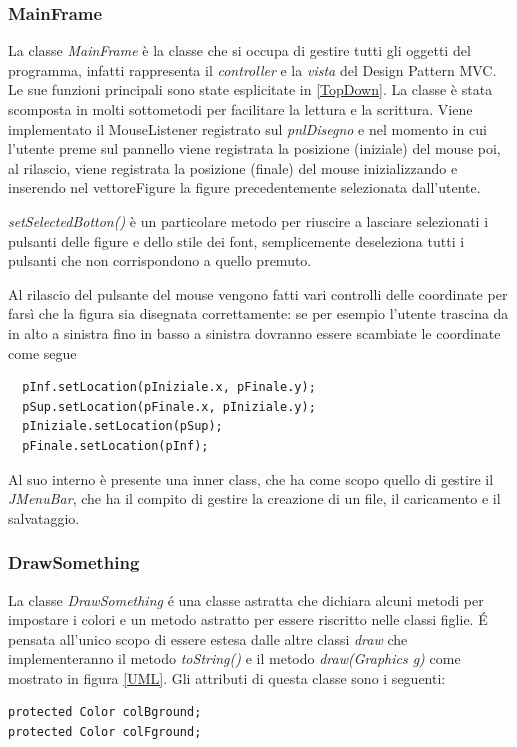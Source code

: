 \documentclass[a4paper,12pt,times,numbered,print,index]{article}
\begin{document}
\subsubsection{MainFrame} %
La classe \textit{MainFrame} è la classe che si occupa di gestire tutti gli oggetti del programma, infatti rappresenta il \textit{controller} e la \textit{vista} del Design Pattern MVC. Le sue funzioni principali sono state esplicitate in \ref{TopDown}. La classe è stata scomposta in molti sottometodi per facilitare la lettura e la scrittura. Viene implementato il MouseListener registrato sul \textit{pnlDisegno} e nel momento in cui l'utente preme sul pannello viene registrata la posizione (iniziale) del mouse poi, al rilascio, viene registrata la posizione (finale) del mouse inizializzando e inserendo nel vettoreFigure la figure precedentemente selezionata dall'utente.

\textit{setSelectedBotton()} è un particolare metodo per riuscire a lasciare selezionati i pulsanti delle figure e dello stile dei font, semplicemente deseleziona tutti i pulsanti che non corrispondono a quello premuto.

Al rilascio del pulsante del mouse vengono fatti vari controlli delle coordinate per farsì che la figura sia disegnata correttamente: se per esempio l'utente trascina da in alto a sinistra fino in basso a sinistra dovranno essere scambiate le coordinate come segue
\begin{lstlisting}
  pInf.setLocation(pIniziale.x, pFinale.y);
  pSup.setLocation(pFinale.x, pIniziale.y);
  pIniziale.setLocation(pSup);
  pFinale.setLocation(pInf);
\end{lstlisting}
Al suo interno è presente una inner class, che ha come scopo quello di gestire il \textit{JMenuBar}, che ha il compito di gestire la creazione di un file, il caricamento e il salvataggio.

\subsubsection{DrawSomething}
La classe \textit{DrawSomething} é una classe astratta che dichiara alcuni metodi per impostare i colori e un metodo astratto per essere riscritto nelle classi figlie.
É pensata all'unico scopo di essere estesa dalle altre classi \textit{draw} che implementeranno il metodo \textit{toString()} e il metodo \textit{draw(Graphics g)} come mostrato in figura \ref{UML}.
Gli attributi di questa classe sono i seguenti:
\begin{lstlisting}
protected Color colBground;
protected Color colFground;
\end{lstlisting}
\end{document}

